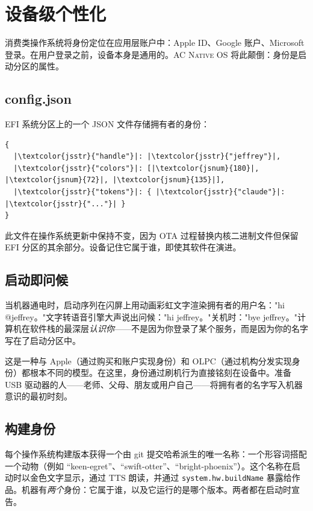 \documentclass[10pt,letterpaper,twocolumn]{article}
\newcommand{\acos}{\textsc{AC Native OS}}
\begin{document}

\section{设备级个性化}
\label{sec:personalization}

消费类操作系统将身份定位在应用层账户中：Apple ID、Google 账户、Microsoft 登录。在用户登录之前，设备本身是通用的。\acos{} 将此颠倒：身份是启动分区的属性。

\subsection{config.json}

EFI 系统分区上的一个 JSON 文件存储拥有者的身份：

\begin{lstlisting}[style=acjsstyle]
{
  |\textcolor{jsstr}{"handle"}|: |\textcolor{jsstr}{"jeffrey"}|,
  |\textcolor{jsstr}{"colors"}|: [|\textcolor{jsnum}{180}|, |\textcolor{jsnum}{72}|, |\textcolor{jsnum}{135}|],
  |\textcolor{jsstr}{"tokens"}|: { |\textcolor{jsstr}{"claude"}|: |\textcolor{jsstr}{"..."}| }
}
\end{lstlisting}

此文件在操作系统更新中保持不变，因为 OTA 过程替换内核二进制文件但保留 EFI 分区的其余部分。设备记住它属于谁，即使其软件在演进。

\subsection{启动即问候}

当机器通电时，启动序列在闪屏上用动画彩虹文字渲染拥有者的用户名："hi @jeffrey。"文字转语音引擎大声说出问候："hi jeffrey。"关机时："bye jeffrey。"计算机在软件栈的最深层\emph{认识你}——不是因为你登录了某个服务，而是因为你的名字写在了启动分区中。

这是一种与 Apple（通过购买和账户实现身份）和 OLPC（通过机构分发实现身份）都根本不同的模型。在这里，身份通过刷机行为直接铭刻在设备中。准备 USB 驱动器的人——老师、父母、朋友或用户自己——将拥有者的名字写入机器意识的最初时刻。

\subsection{构建身份}

每个操作系统构建版本获得一个由 git 提交哈希派生的唯一名称：一个形容词搭配一个动物（例如 ``keen-egret''、``swift-otter''、``bright-phoenix''）。这个名称在启动时以金色文字显示，通过 TTS 朗读，并通过 \texttt{system.hw.buildName} 暴露给作品。机器有\emph{两个}身份：它属于谁，以及它运行的是哪个版本。两者都在启动时宣告。
\end{document}
